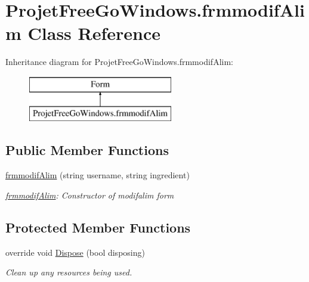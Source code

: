 \hypertarget{class_projet_free_go_windows_1_1frmmodif_alim}{}\section{Projet\+Free\+Go\+Windows.\+frmmodif\+Alim Class Reference}
\label{class_projet_free_go_windows_1_1frmmodif_alim}
Inheritance diagram for Projet\+Free\+Go\+Windows.\+frmmodif\+Alim\+:\begin{figure}[H]
\begin{center}
\leavevmode
\includegraphics[height=2.000000cm]{class_projet_free_go_windows_1_1frmmodif_alim}
\end{center}
\end{figure}
\subsection*{Public Member Functions}
\begin{DoxyCompactItemize}
\item 
\hyperlink{class_projet_free_go_windows_1_1frmmodif_alim_ae4dad1f3b57da9269eb3abdadeacc763}{frmmodif\+Alim} (string username, string ingredient)
\begin{DoxyCompactList}\small\item\em \hyperlink{class_projet_free_go_windows_1_1frmmodif_alim}{frmmodif\+Alim}\+: Constructor of modifalim form \end{DoxyCompactList}\end{DoxyCompactItemize}
\subsection*{Protected Member Functions}
\begin{DoxyCompactItemize}
\item 
override void \hyperlink{class_projet_free_go_windows_1_1frmmodif_alim_a37e6c0909aa15804e3da5691c404020d}{Dispose} (bool disposing)
\begin{DoxyCompactList}\small\item\em Clean up any resources being used. \end{DoxyCompactList}\end{DoxyCompactItemize}



